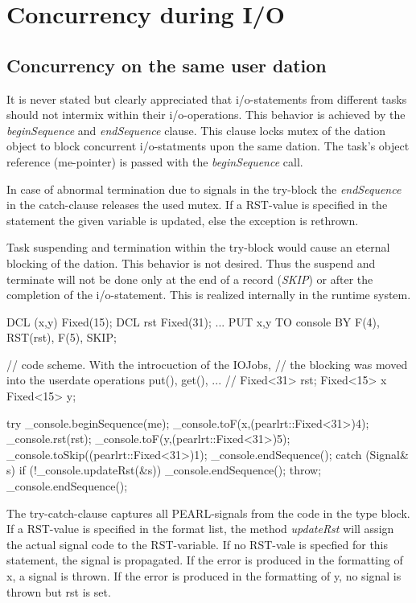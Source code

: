 \section{Concurrency during I/O}
\label{ioconcurrency}

\subsection{Concurrency on the same user dation}
It is never stated but clearly appreciated that i/o-statements from
different tasks should not intermix within their i/o-operations.
This behavior is achieved by the {\em beginSequence} and 
{\em endSequence} clause. 
This clause locks mutex of the dation object to block concurrent
i/o-statments upon the same dation.
The task's object reference (me-pointer) is passed with
the {\em beginSequence} call.

In case of abnormal termination due to signals in the try-block
the {\em endSequence} in the catch-clause releases the used mutex.
If a RST-value is specified in the statement the given variable is
updated, else the exception is rethrown.

Task suspending and termination within the try-block would cause an
eternal blocking of the dation. 
This behavior is not desired.
Thus the suspend and terminate will not be done only at the end of a record
({\em SKIP}) or after the completion of the i/o-statement.
This is realized internally in the runtime system.

\begin{PEARLCode}
DCL (x,y) Fixed(15);
DCL rst Fixed(31);
...
PUT x,y TO console BY F(4), RST(rst), F(5), SKIP;
\end{PEARLCode}

\begin{CppCode}
// code scheme. With the introcuction of the IOJobs,
// the blocking was moved into the userdate operations put(), get(), ...
//
Fixed<31> rst;
Fixed<15> x
Fixed<15> y;

try {
   _console.beginSequence(me);
   _console.toF(x,(pearlrt::Fixed<31>)4);
   _console.rst(rst);
   _console.toF(y,(pearlrt::Fixed<31>)5);
   _console.toSkip((pearlrt::Fixed<31>)1);
   _console.endSequence();
} catch (Signal& s) {
   if (!_console.updateRst(&s)) {
      _console.endSequence();
      throw;
   }
   _console.endSequence();
}
\end{CppCode}

The try-catch-clause captures all PEARL-signals from the code in the 
type block. If a RST-value is specified in the format list, the method
{\em updateRst} will assign the actual signal code to the RST-variable.
If no RST-vale is specfied for this statement, the signal is propagated.
If the error is produced in the formatting of x, a signal is thrown.
If the error is produced in the formatting of y, no signal is thrown but rst
is set.

